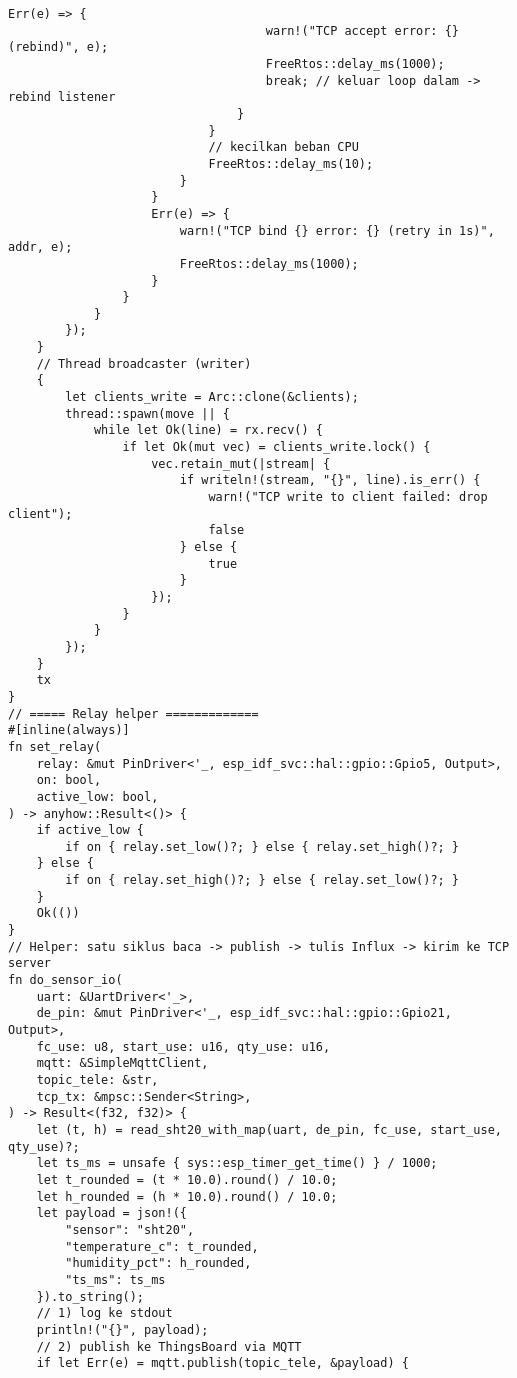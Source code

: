 \documentclass[a4paper, 12pt]{article}
\begin{document}
\begin{lstlisting}[style=ruststyle, caption={main.rs}, basicstyle=\ttfamily\tiny]
                                Err(e) => {
                                    warn!("TCP accept error: {} (rebind)", e);
                                    FreeRtos::delay_ms(1000);
                                    break; // keluar loop dalam -> rebind listener
                                }
                            }
                            // kecilkan beban CPU
                            FreeRtos::delay_ms(10);
                        }
                    }
                    Err(e) => {
                        warn!("TCP bind {} error: {} (retry in 1s)", addr, e);
                        FreeRtos::delay_ms(1000);
                    }
                }
            }
        });
    }
    // Thread broadcaster (writer)
    {
        let clients_write = Arc::clone(&clients);
        thread::spawn(move || {
            while let Ok(line) = rx.recv() {
                if let Ok(mut vec) = clients_write.lock() {
                    vec.retain_mut(|stream| {
                        if writeln!(stream, "{}", line).is_err() {
                            warn!("TCP write to client failed: drop client");
                            false
                        } else {
                            true
                        }
                    });
                }
            }
        });
    }
    tx
}
// ===== Relay helper =============
#[inline(always)]
fn set_relay(
    relay: &mut PinDriver<'_, esp_idf_svc::hal::gpio::Gpio5, Output>,
    on: bool,
    active_low: bool,
) -> anyhow::Result<()> {
    if active_low {
        if on { relay.set_low()?; } else { relay.set_high()?; }
    } else {
        if on { relay.set_high()?; } else { relay.set_low()?; }
    }
    Ok(())
}
// Helper: satu siklus baca -> publish -> tulis Influx -> kirim ke TCP server
fn do_sensor_io(
    uart: &UartDriver<'_>,
    de_pin: &mut PinDriver<'_, esp_idf_svc::hal::gpio::Gpio21, Output>,
    fc_use: u8, start_use: u16, qty_use: u16,
    mqtt: &SimpleMqttClient,
    topic_tele: &str,
    tcp_tx: &mpsc::Sender<String>,
) -> Result<(f32, f32)> {
    let (t, h) = read_sht20_with_map(uart, de_pin, fc_use, start_use, qty_use)?;
    let ts_ms = unsafe { sys::esp_timer_get_time() } / 1000;
    let t_rounded = (t * 10.0).round() / 10.0;
    let h_rounded = (h * 10.0).round() / 10.0;
    let payload = json!({
        "sensor": "sht20",
        "temperature_c": t_rounded,
        "humidity_pct": h_rounded,
        "ts_ms": ts_ms
    }).to_string();
    // 1) log ke stdout
    println!("{}", payload);
    // 2) publish ke ThingsBoard via MQTT
    if let Err(e) = mqtt.publish(topic_tele, &payload) {

\end{lstlisting}
\end{document}
